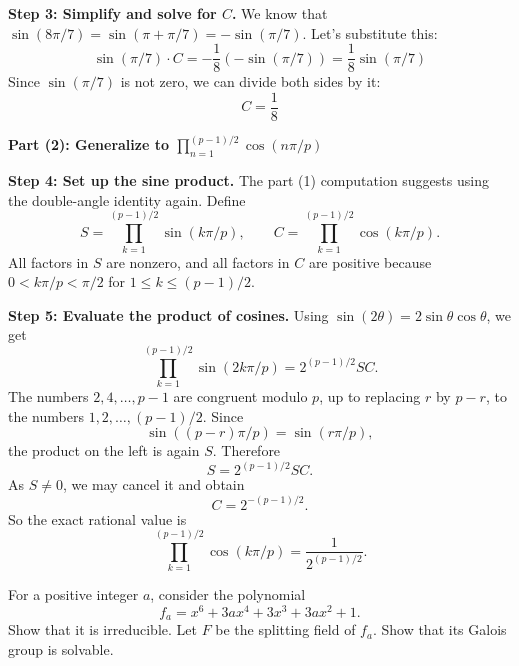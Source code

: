 \begin{solution}
\textbf{Step 3: Simplify and solve for $C$.}
We know that $\sin(8\pi/7) = \sin(\pi + \pi/7) = -\sin(\pi/7)$. Let's substitute this:
\[ \sin(\pi/7) \cdot C = -\frac{1}{8} (-\sin(\pi/7)) = \frac{1}{8} \sin(\pi/7) \]
Since $\sin(\pi/7)$ is not zero, we can divide both sides by it:
\[ C = \frac{1}{8} \]

\textbf{Part (2): Generalize to $\prod_{n=1}^{(p-1)/2} \cos(n\pi/p)$}

\textbf{Step 4: Set up the sine product.}
The part (1) computation suggests using the double-angle identity again. Define
\[
S=\prod_{k=1}^{(p-1)/2}\sin(k\pi/p),
\qquad
C=\prod_{k=1}^{(p-1)/2}\cos(k\pi/p).
\]
All factors in $S$ are nonzero, and all factors in $C$ are positive because $0<k\pi/p<\pi/2$ for $1\leq k\leq (p-1)/2$.

\textbf{Step 5: Evaluate the product of cosines.}
Using $\sin(2\theta)=2\sin\theta\cos\theta$, we get
\[
\prod_{k=1}^{(p-1)/2}\sin(2k\pi/p)=2^{(p-1)/2}SC.
\]
The numbers $2,4,\ldots,p-1$ are congruent modulo $p$, up to replacing $r$ by $p-r$, to the numbers $1,2,\ldots,(p-1)/2$. Since
\[
\sin((p-r)\pi/p)=\sin(r\pi/p),
\]
the product on the left is again $S$. Therefore
\[
S=2^{(p-1)/2}SC.
\]
As $S\ne 0$, we may cancel it and obtain
\[
C=2^{-(p-1)/2}.
\]
So the exact rational value is
\[
\prod_{k=1}^{(p-1)/2}\cos(k\pi/p)=\frac{1}{2^{(p-1)/2}}.
\]
\end{solution}

\begin{exercise}
\label{algebra:2010:10}
For a positive integer $a$, consider the polynomial
\[ f_a = x^6 + 3ax^4 + 3x^3 + 3ax^2 + 1. \]
Show that it is irreducible. Let $F$ be the splitting field of $f_a$. Show that its Galois group is solvable.
\end{exercise}

